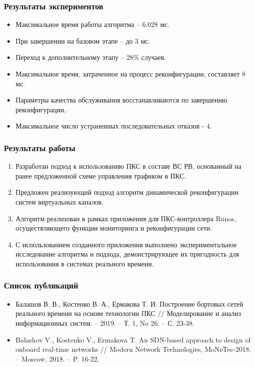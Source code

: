 \documentclass[14pt, handout]{beamer}
\begin{document}
\begin{frame}
\frametitle{Результаты экспериментов}

\begin{itemize}
	\item Максимальное время работы алгоритма -- 6.028 мс. 
	\item При завершении на базовом этапе -- до 3 мс.
	\item Переход к дополнительному этапу -- 28\% случаев.
	\item Максимальное время, затраченное на процесс реконфигурации, составляет 8 мс.
	\item Параметры качества обслуживания восстанавливаются по завершению реконфигурации.
	\item Максимальное число устраненных последовательных отказов - 4.
\end{itemize}

\end{frame}



\begin{frame}
\frametitle{Результаты работы}

\begin{enumerate}
	\small
	\item Разработан подход к использованию ПКС в составе ВС РВ, основанный на ранее предложенной схеме управления трафиком в ПКС.
	\item Предложен реализующий подход алгоритм динамической реконфигурации систем виртуальных каналов.
	\item Алгоритм реализован в рамках приложения для ПКС-контроллера Runos, осуществляющего функции мониторинга и реконфигурации сети.
	\item С использованием созданного приложения выполнено экспериментальное исследование алгоритма и подхода, демонстрирующее их пригодность для использования в системах реального времени.
\end{enumerate}

\end{frame}




\begin{frame}
\frametitle{Список публикаций}

\begin{itemize}
	\item Балашов В. В., Костенко В. А., Ермакова Т. И. Построение бортовых сетей реального времени на основе технологии ПКС // Моделирование и анализ информационных систем. -- 2019. -- Т. 1, No 26. -- С. 23-38.
	\item Balashov V., Kostenko V., Ermakova T. An SDN-based approach to design of onboard real-time networks // Modern Network Technologies, MoNeTec-2018. -- Moscow, 2018. -- P. 16-22.
\end{itemize}

\end{frame}
\end{document}
